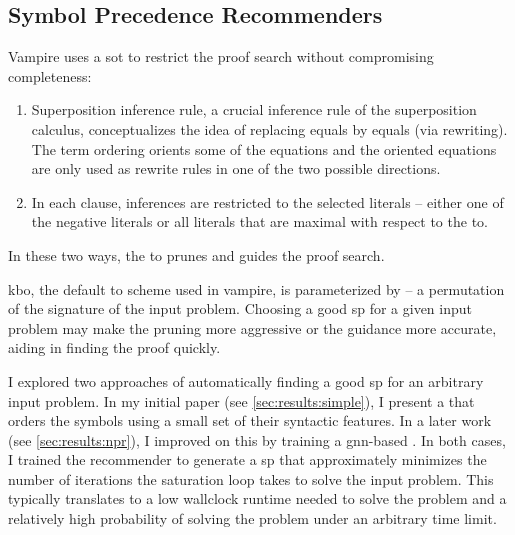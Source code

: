 \subsection{Symbol Precedence Recommenders}
\label{sec:contrib:SymbolPrecedenceRecommenders}

Vampire uses a \gls{sot} \cite{} to restrict the proof search without compromising completeness:
\begin{enumerate}
\item Superposition inference rule, a crucial inference rule of the superposition calculus, conceptualizes the idea of replacing equals by equals (via rewriting).
The term ordering orients some of the equations and the oriented equations are only used as rewrite rules in one of the two possible directions.
\item In each clause, inferences are restricted to the selected literals --
either one of the negative literals
or all literals that are maximal with respect to the \gls{to}.
\end{enumerate}
In these two ways, the \gls{to} prunes and guides the proof search.

\Gls{kbo}, the default \gls{to} scheme used in \gls{vampire}, is parameterized by  -- a permutation of the \gls{signature} of the input problem.
Choosing a good \gls{sp} for a given input problem
may make the pruning more aggressive or the guidance more accurate,
aiding in finding the proof quickly.

I explored two approaches of automatically finding a good \gls{sp} for an arbitrary input problem.
In my initial paper \cite{DBLP:conf/cade/Bartek020} (see \cref{sec:results:simple}),
I present a  that orders the symbols using a small set of their syntactic features.
In a later work \cite{DBLP:conf/cade/Bartek021} (see \cref{sec:results:npr}),
I improved on this by training a \acrshort{gnn}-based .
In both cases, I trained the recommender to generate a \gls{sp} that
approximately minimizes the number of iterations the saturation loop takes to solve the input problem.
This typically translates to
a low \gls{wallclock} \gls{runtime} needed to solve the problem and
a relatively high probability of solving the problem under an arbitrary time limit.

